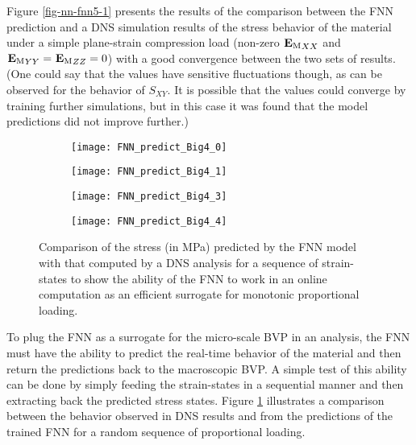 Figure \ref{fig-nn-fnn5-1} presents the results of the comparison between the FNN prediction and a DNS simulation results of the stress behavior of the material under a simple plane-strain compression load (non-zero $ {^{}\textbf{E}_\text{M}}_{XX} $ and $ {^{}\textbf{E}_\text{M}}_{YY}={^{}\textbf{E}_\text{M}}_{ZZ}=0 $) with a good convergence between the two sets of results. (One could say that the values have sensitive fluctuations though, as can be observed for the behavior of $ S_{XY} $. It is possible that the values could converge by training further simulations, but in this case it was found that the model predictions did not improve further.)

\begin{figure}
	\centering
	\begin{subfigure}[t]{0.45\textwidth}
		\texttt{[image: FNN\_predict\_Big4\_0]}
	\end{subfigure}
	\begin{subfigure}[t]{0.45\textwidth}
		\texttt{[image: FNN\_predict\_Big4\_1]}
	\end{subfigure}
	\begin{subfigure}[t]{0.45\textwidth}
		\texttt{[image: FNN\_predict\_Big4\_3]}
	\end{subfigure}
	\begin{subfigure}[t]{0.45\textwidth}
		\texttt{[image: FNN\_predict\_Big4\_4]}
	\end{subfigure}
	\caption{Comparison of the stress (in MPa) predicted by the FNN model with that computed by a DNS analysis for a sequence of strain-states to show the ability of the FNN to work in an online computation as an efficient surrogate for monotonic proportional loading.}\label{fig-nn-fnn5}
\end{figure}

To plug the FNN as a surrogate for the micro-scale BVP in an \fee analysis, the FNN must have the ability to predict the real-time behavior of the material and then return the predictions back to the macroscopic BVP. A simple test of this ability can be done by simply feeding the strain-states in a sequential manner and then extracting back the predicted stress states. Figure \ref{fig-nn-fnn5} illustrates a comparison between the behavior observed in DNS results and from the predictions of the trained FNN for a random sequence of proportional loading.

